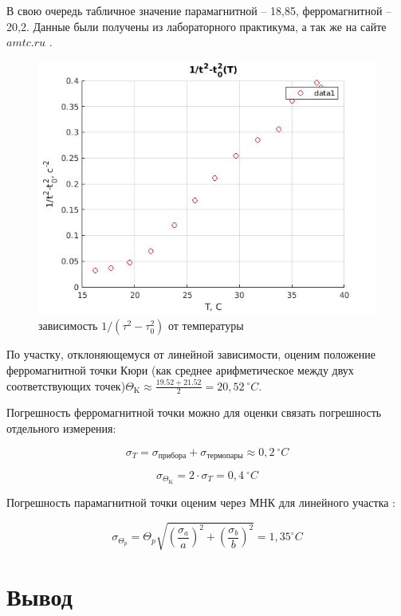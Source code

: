 \documentclass[a4paper, 12pt]{article}%
\begin{document}
В свою очередь табличное значение парамагнитной -- 18,85, ферромагнитной -- 20,2. Данные были получены из лабораторного практикума, а так же на сайте $amtc.ru$ .

\begin{figure}[!h]
    \centering
	\includegraphics[scale = 0.5]{justPoints.jpg}
    \caption{зависимость $1 /\left(\tau^{2}-\tau_{0}^{2}\right)$ от температуры }
    \label{scheme}
\end{figure}


По участку, отклоняющемуся от линейной зависимости, оценим положение ферромагнитной точки Кюри (как среднее арифметическое между двух соответствующих точек)$\Theta_{\mathrm{K}} \approx \frac{19.52 + 21.52}{2} = 20,52\ ^{\circ}C$.

Погрешность ферромагнитной точки можно для оценки связать погрешность отдельного измерения:

\[  \sigma_T = \sigma_{\text{прибора}} + \sigma_{\text{термопары}} \approx 0,2\ ^{\circ} C\]

\[ \sigma_{\Theta_{\mathrm{K}}} = 2 \cdot \sigma_T = 0,4\ ^{\circ}C\]

Погрешность парамагнитной точки оценим через МНК для линейного участка :

\begin{equation}\label{}
\sigma_{\Theta_p} = \Theta_p \sqrt{\left(\dfrac{\sigma_a}{a}\right)^2 +\left(\dfrac{\sigma_b}{b}\right)^2} = 1,35 ^{\circ} C
\end{equation}

\section{Вывод}
\end{document}
